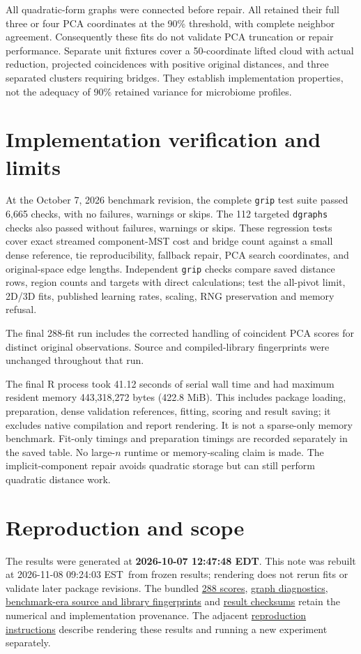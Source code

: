 \documentclass[11pt,letterpaper]{article}
\providecommand{\reportbuilddatetime}{unknown}
\renewcommand{\reportbuilddatetime}{2026-11-08 09:24:03 EST}
\begin{document}
All quadratic-form graphs were connected before repair. All retained their
full three or four PCA coordinates at the 90\% threshold, with complete neighbor
agreement. Consequently these fits do not validate PCA truncation or repair
performance. Separate unit fixtures cover a 50-coordinate lifted cloud with
actual reduction, projected coincidences with positive original distances,
and three separated clusters requiring bridges. They establish implementation
properties, not the adequacy of 90\% retained variance for microbiome profiles.

\clearpage\section{Implementation verification and limits}
At the October 7, 2026 benchmark revision, the complete
\texttt{grip} test suite passed 6,665 checks, with no failures,
warnings or skips. The 112 targeted \texttt{dgraphs} checks also passed without failures, warnings
or skips. These regression tests cover exact
streamed component-MST cost and bridge count against a small dense reference,
tie reproducibility, fallback repair, PCA search coordinates, and original-space
edge lengths. Independent \texttt{grip} checks compare saved distance rows,
region counts and targets with direct calculations; test the all-pivot limit,
2D/3D fits, published learning rates, scaling, RNG preservation and memory refusal.

The final 288-fit run includes the corrected handling of coincident PCA scores
for distinct original observations. Source and compiled-library fingerprints
were unchanged throughout that run.

The final R process took 41.12 seconds of serial wall time and had maximum
resident memory 443,318,272 bytes (422.8 MiB). This includes package loading,
preparation, dense validation references, fitting, scoring and result saving;
it excludes native compilation and report rendering. It is not a sparse-only
memory benchmark. Fit-only timings and preparation timings are recorded
separately in the saved table. No large-$n$ runtime or memory-scaling claim is
made. The implicit-component repair avoids quadratic storage but can still
perform quadratic distance work.

\section{Reproduction and scope}
The results were generated at \textbf{2026-10-07 12:47:48 EDT}. This note was rebuilt
at \reportbuilddatetime\ from frozen results; rendering does not rerun fits or
validate later package revisions. The bundled
\href{results/fits.csv}{288 scores},
\href{results/graphs.csv}{graph diagnostics},
\href{results/source_manifest.csv}{benchmark-era source and library fingerprints}
and \href{results/provenance.json}{result checksums} retain the numerical
and implementation provenance. The adjacent \href{README.md}{reproduction instructions}
describe rendering these results and running a new experiment separately.
\end{document}
